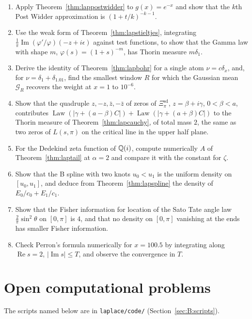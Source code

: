 \begin{enumerate}
\item Apply Theorem~\ref{thm:lappostwidder} to $g(x)=e^{-x}$ and show that the $k$th Post Widder approximation is $(1+t/k)^{-k-1}$.
\item Use the weak form of Theorem~\ref{thm:lapstieltjes}, integrating $\frac1\pi\operatorname{Im}(\varphi'/\varphi)(-z+i\epsilon)$ against test functions, to show that the Gamma law with shape $m$, $\varphi(s)=(1+s)^{-m}$, has Thorin measure $m\delta_1$.
\item Derive the identity of Theorem~\ref{thm:lapbohr} for a single atom $\nu=c\delta_x$, and, for $\nu=\delta_1+\delta_{1.01}$, find the smallest window $R$ for which the Gaussian mean $\mathcal G_R$ recovers the weight at $x=1$ to $10^{-6}$.
\item Show that the quadruple $z,-z,\bar z,-\bar z$ of zeros of $\Xi^{\mathrm{sd}}_\pi$, $z=\beta+i\gamma$, $0<\beta<a$, contributes $\operatorname{Law}(|\gamma+(a-\beta)C|)+\operatorname{Law}(|\gamma+(a+\beta)C|)$ to the Thorin measure of Theorem~\ref{thm:lapcauchy}, of total mass $2$, the same as two zeros of $L(s,\pi)$ on the critical line in the upper half plane.
\item For the Dedekind zeta function of $\mathbb{Q}(i)$, compute numerically $A$ of Theorem~\ref{thm:laptail} at $\alpha=2$ and compare it with the constant for $\zeta$.
\item Show that the B spline with two knots $u_0<u_1$ is the uniform density on $[u_0,u_1]$, and deduce from Theorem~\ref{thm:lapspline} the density of $E_0/c_0+E_1/c_1$.
\item Show that the Fisher information for location of the Sato Tate angle law $\frac2\pi\sin^2\theta$ on $[0,\pi]$ is $4$, and that no density on $[0,\pi]$ vanishing at the ends has smaller Fisher information.
\item Check Perron's formula numerically for $x=100.5$ by integrating along $\operatorname{Re}s=2$, $|\operatorname{Im}s|\le T$, and observe the convergence in $T$.
\end{enumerate}

\section{Open computational problems}

The scripts named below are in \texttt{laplace/code/} (Section~\ref{sec:B:scripts}).

